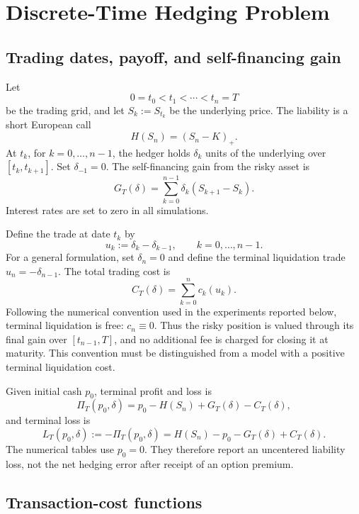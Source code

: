 \section{Discrete-Time Hedging Problem}
\label{sec:problem}

\subsection{Trading dates, payoff, and self-financing gain}

Let
\[
  0=t_0<t_1<\cdots<t_n=T
\]
be the trading grid, and let $S_k:=S_{t_k}$ be the underlying price. The
liability is a short European call
\[
  H(S_n)=(S_n-K)_+.
\]
At $t_k$, for $k=0,\ldots,n-1$, the hedger holds $\delta_k$ units of the
underlying over $[t_k,t_{k+1}]$. Set $\delta_{-1}=0$. The self-financing gain
from the risky asset is
\[
  G_T(\delta)=\sum_{k=0}^{n-1}\delta_k(S_{k+1}-S_k).
\]
Interest rates are set to zero in all simulations.

Define the trade at date $t_k$ by
\[
  u_k:=\delta_k-\delta_{k-1},\qquad k=0,\ldots,n-1.
\]
For a general formulation, set $\delta_n=0$ and define the terminal liquidation
trade $u_n=-\delta_{n-1}$. The total trading cost is
\[
  C_T(\delta)=\sum_{k=0}^{n}c_k(u_k).
\]
Following the numerical convention used in the experiments reported below,
terminal liquidation is free: $c_n\equiv0$. Thus the risky position is valued
through its final gain over $[t_{n-1},T]$, and no additional fee is charged for
closing it at maturity. This convention must be distinguished from a model
with a positive terminal liquidation cost.

Given initial cash $p_0$, terminal profit and loss is
\begin{equation}
  \Pi_T(p_0,\delta)
  =p_0-H(S_n)+G_T(\delta)-C_T(\delta),
  \label{eq:pnl}
\end{equation}
and terminal loss is
\begin{equation}
  L_T(p_0,\delta)
  :=-\Pi_T(p_0,\delta)
  =H(S_n)-p_0-G_T(\delta)+C_T(\delta).
  \label{eq:loss}
\end{equation}
The numerical tables use $p_0=0$. They therefore report an uncentered liability
loss, not the net hedging error after receipt of an option premium.

\subsection{Transaction-cost functions}

